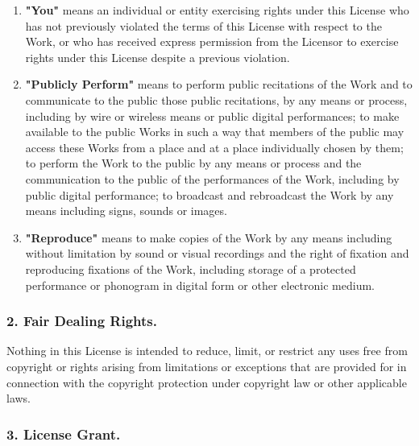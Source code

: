 \begin{enumerate}
          \item\textbf{"You"} means an individual or entity
          exercising rights under this License who has not
          previously violated the terms of this License with
          respect to the Work, or who has received express
          permission from the Licensor to exercise rights under
          this License despite a previous violation.

          \item\textbf{"Publicly Perform"} means to perform
          public recitations of the Work and to communicate to the
          public those public recitations, by any means or process,
          including by wire or wireless means or public digital
          performances; to make available to the public Works in
          such a way that members of the public may access these
          Works from a place and at a place individually chosen by
          them; to perform the Work to the public by any means or
          process and the communication to the public of the
          performances of the Work, including by public digital
          performance; to broadcast and rebroadcast the Work by any
          means including signs, sounds or images.

          \item\textbf{"Reproduce"} means to make copies of
          the Work by any means including without limitation by
          sound or visual recordings and the right of fixation and
          reproducing fixations of the Work, including storage of a
          protected performance or phonogram in digital form or
          other electronic medium.
\end{enumerate}


        \subsubsection{2. Fair Dealing Rights.}

Nothing in this
        License is intended to reduce, limit, or restrict any uses
        free from copyright or rights arising from limitations or
        exceptions that are provided for in connection with the
        copyright protection under copyright law or other
        applicable laws.

        \subsubsection{3. License Grant.}

